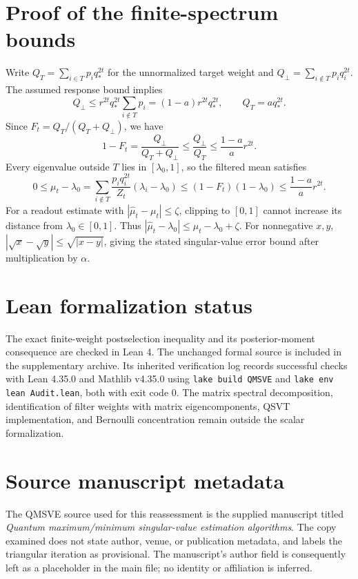 \documentclass[11pt]{article}
\begin{document}
\appendix
\section{Proof of the finite-spectrum bounds}\label{app:proof}
Write $Q_T=\sum_{i\in T}p_iq_*^{2t}$ for the unnormalized target weight and $Q_{\perp}=\sum_{i\notin T}p_iq_i^{2t}$. The assumed response bound implies
\[
 Q_{\perp}\leq r^{2t}q_*^{2t}\sum_{i\notin T}p_i
 = (1-a)r^{2t}q_*^{2t},\qquad
 Q_T=aq_*^{2t}.
\]
Since $F_t=Q_T/(Q_T+Q_{\perp})$, we have
\[
 1-F_t=\frac{Q_{\perp}}{Q_T+Q_{\perp}}
 \leq\frac{Q_{\perp}}{Q_T}
 \leq\frac{1-a}{a}r^{2t}.
\]
Every eigenvalue outside $T$ lies in $[\lambda_0,1]$, so the filtered mean satisfies
\[
 0\leq\mu_t-\lambda_0
 =\sum_{i\notin T}\frac{p_iq_i^{2t}}{Z_t}(\lambda_i-\lambda_0)
 \leq(1-F_t)(1-\lambda_0)
 \leq\frac{1-a}{a}r^{2t}.
\]
For a readout estimate with $|\widehat\mu_t-\mu_t|\leq\zeta$, clipping to $[0,1]$ cannot increase its distance from $\lambda_0\in[0,1]$. Thus $|\widehat\mu_t-\lambda_0|\leq\mu_t-\lambda_0+\zeta$. For nonnegative $x,y$, $|\sqrt{x}-\sqrt{y}|\leq\sqrt{|x-y|}$, giving the stated singular-value error bound after multiplication by $\alpha$.

\section{Lean formalization status}\label{app:lean}
The exact finite-weight postselection inequality and its posterior-moment consequence are checked in Lean 4. The unchanged formal source is included in the supplementary archive. Its inherited verification log records successful checks with Lean 4.35.0 and Mathlib v4.35.0 using \texttt{lake build QMSVE} and \texttt{lake env lean Audit.lean}, both with exit code 0. The matrix spectral decomposition, identification of filter weights with matrix eigencomponents, QSVT implementation, and Bernoulli concentration remain outside the scalar formalization.

\section{Source manuscript metadata}
The QMSVE source used for this reassessment is the supplied manuscript titled \emph{Quantum maximum/minimum singular-value estimation algorithms}. The copy examined does not state author, venue, or publication metadata, and labels the triangular iteration as provisional. The manuscript's author field is consequently left as a placeholder in the main file; no identity or affiliation is inferred.
\end{document}
